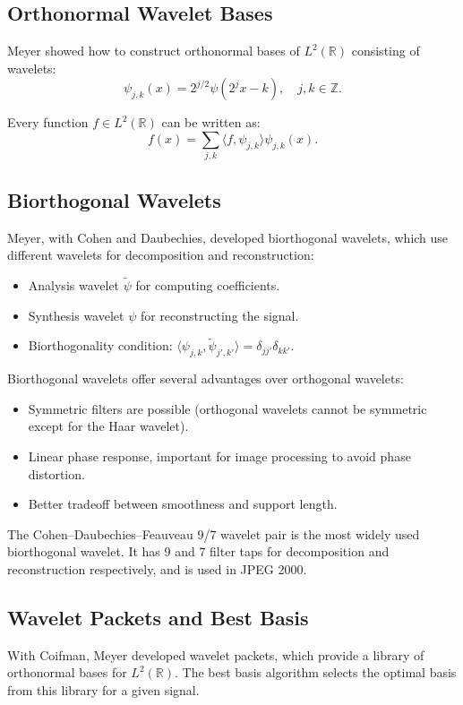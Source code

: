 \subsection{Orthonormal Wavelet Bases}

Meyer showed how to construct orthonormal bases of $L^2(\mathbb{R})$ consisting of wavelets:
\[
\psi_{j,k}(x) = 2^{j/2} \psi(2^j x - k), \quad j, k \in \mathbb{Z}.
\]

Every function $f \in L^2(\mathbb{R})$ can be written as:
\[
f(x) = \sum_{j,k} \langle f, \psi_{j,k} \rangle \psi_{j,k}(x).
\]

\subsection{Biorthogonal Wavelets}

Meyer, with Cohen and Daubechies, developed biorthogonal wavelets, which use different wavelets for decomposition and reconstruction:
\begin{itemize}
\item Analysis wavelet $\tilde\psi$ for computing coefficients.
\item Synthesis wavelet $\psi$ for reconstructing the signal.
\item Biorthogonality condition: $\langle \psi_{j,k}, \tilde\psi_{j',k'} \rangle = \delta_{jj'}\delta_{kk'}$.
\end{itemize}

Biorthogonal wavelets offer several advantages over orthogonal wavelets:
\begin{itemize}
\item Symmetric filters are possible (orthogonal wavelets cannot be symmetric except for the Haar wavelet).
\item Linear phase response, important for image processing to avoid phase distortion.
\item Better tradeoff between smoothness and support length.
\end{itemize}

The Cohen--Daubechies--Feauveau 9/7 wavelet pair is the most widely used biorthogonal wavelet. It has 9 and 7 filter taps for decomposition and reconstruction respectively, and is used in JPEG 2000.

\subsection{Wavelet Packets and Best Basis}

With Coifman, Meyer developed wavelet packets, which provide a library of orthonormal bases for $L^2(\mathbb{R})$. The best basis algorithm selects the optimal basis from this library for a given signal.

